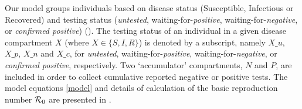 
Our model groups individuals based on disease status (Susceptible, Infectious or Recovered) and testing status (\emph{untested}, waiting-for-\emph{positive}, waiting-for-\emph{negative}, or \emph{confirmed positive}) ().  The testing status of an individual in a given disease compartment $X$ (where $X \in \{S,I,R\}$) is denoted by a subscript, namely $X\_u$, $X\_p$, $X\_n$ and $X\_c$, for \emph{untested}, waiting-for-\emph{positive}, waiting-for-\emph{negative}, or \emph{confirmed positive}, respectively.  Two `accumulator' compartments, $N$ and $P$, are included in order to collect cumulative reported negative or positive tests. The model equations \eqref{model} and details of calculation of the basic reproduction number $\mathcal{R}_0$ are presented in .

